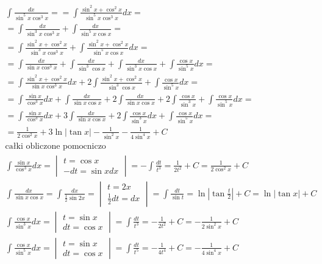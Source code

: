 \begin{gather*}
  \int \frac{dx}{\sin^5 x \cos^3 x} =
  = \int \frac{\sin^2 x+\cos^2 x}{\sin^5 x \cos^3 x}dx = \\
  = \int \frac{dx}{\sin^3 x \cos^3 x}+\int \frac{dx}{\sin^5 x \cos x} = \\
  = \int \frac{\sin^2 x+\cos^2 x}{\sin^3 x\cos^3 x}+\int \frac{\sin^2x+\cos^2x}{\sin^5x\cos x}dx = \\
  = \int \frac{dx}{\sin x\cos^3 x}+\int \frac{dx}{\sin^3\cos x}+\int \frac{dx}{\sin^3 x\cos x}+\int \frac{\cos x}{\sin^5 x}dx = \\
  = \int \frac{\sin^2 x+\cos^2 x}{\sin x\cos^3 x}dx+2\int \frac{\sin^2 x+\cos^2 x}{\sin^3\cos x}+\int \frac{\cos x}{\sin^5 x}dx = \\
  = \int \frac{\sin x}{\cos^3 x}dx + \int \frac{dx}{\sin x\cos x} + 2\int \frac{dx}{\sin x\cos x}+2\int \frac{\cos x}{\sin^3 x}+\int \frac{\cos x}{\sin^5 x}dx = \\
  = \int \frac{\sin x}{\cos^3 x}dx + 3\int \frac{dx}{\sin x\cos x}+2\int \frac{\cos x}{\sin^3 x}dx+\int \frac{\cos x}{\sin^5 x}dx = \\
  = \frac{1}{2\cos^2 x}+3\ln|\tan x|-\frac{1}{\sin^2 x}-\frac{1}{4\sin^4 x}+C \\
  \text{całki obliczone pomocniczo} \\
  \int \frac{\sin x}{\cos^3 x}dx =
  \begin{vmatrix}
    t=\cos x \\
    -dt=\sin x dx
  \end{vmatrix}
  = -\int \frac{dt}{t^3} = \frac{1}{2t^2}+ C = \frac{1}{2\cos^2 x}+C \\
  \int \frac{dx}{\sin x\cos x}
  = \int \frac{dx}{\frac{1}{2}\sin 2x}
  = \begin{vmatrix}
    t=2x \\
    \frac{1}{2}dt=dx
  \end{vmatrix}
  = \int \frac{dt}{\sin t}
  = \ln|\tan \frac{t}{2}|+C
  = \ln|\tan x|+C  \\
  \int \frac{\cos x}{\sin^3 x}dx
  = \begin{vmatrix}
    t=\sin x \\
    dt=\cos x
  \end{vmatrix}
  = \int \frac{dt}{t^3}
  = -\frac{1}{2t^2}+C
  = -\frac{1}{2\sin^2 x}+C  \\
  \int \frac{\cos x}{\sin^5 x}dx =
  \begin{vmatrix}
    t=\sin x \\
    dt=\cos x
  \end{vmatrix}
  = \int \frac{dt}{t^5}
  = -\frac{1}{4t^4}+C
  = -\frac{1}{4\sin^4 x}+C
\end{gather*}



